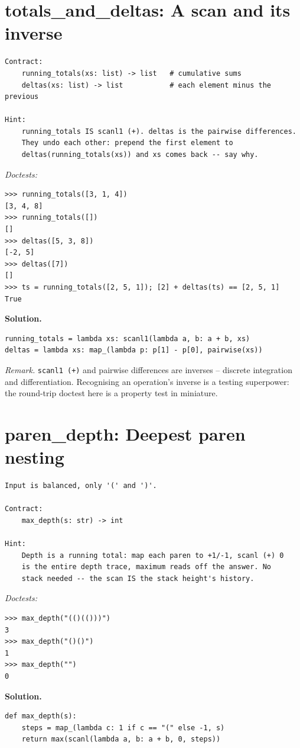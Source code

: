 \documentclass[11pt,letterpaper]{book}
\begin{document}
\section{totals\_and\_deltas: A scan and its inverse}
\begin{lstlisting}[style=spec]
Contract:
    running_totals(xs: list) -> list   # cumulative sums
    deltas(xs: list) -> list           # each element minus the previous

Hint:
    running_totals IS scanl1 (+). deltas is the pairwise differences.
    They undo each other: prepend the first element to
    deltas(running_totals(xs)) and xs comes back -- say why.
\end{lstlisting}
\noindent\textit{Doctests:}
\begin{lstlisting}[style=spec]
>>> running_totals([3, 1, 4])
[3, 4, 8]
>>> running_totals([])
[]
>>> deltas([5, 3, 8])
[-2, 5]
>>> deltas([7])
[]
>>> ts = running_totals([2, 5, 1]); [2] + deltas(ts) == [2, 5, 1]
True
\end{lstlisting}
\noindent\textbf{Solution.}
\begin{lstlisting}[style=code]
running_totals = lambda xs: scanl1(lambda a, b: a + b, xs)
deltas = lambda xs: map_(lambda p: p[1] - p[0], pairwise(xs))
\end{lstlisting}

\noindent\textit{Remark.} \texttt{scanl1 (+)} and pairwise differences are
inverses -- discrete integration and differentiation. Recognising an operation's
inverse is a testing superpower: the round-trip doctest here is a property test
in miniature.

\section{paren\_depth: Deepest paren nesting}
\begin{lstlisting}[style=spec]
Input is balanced, only '(' and ')'.

Contract:
    max_depth(s: str) -> int

Hint:
    Depth is a running total: map each paren to +1/-1, scanl (+) 0
    is the entire depth trace, maximum reads off the answer. No
    stack needed -- the scan IS the stack height's history.
\end{lstlisting}
\noindent\textit{Doctests:}
\begin{lstlisting}[style=spec]
>>> max_depth("(()(()))")
3
>>> max_depth("()()")
1
>>> max_depth("")
0
\end{lstlisting}
\noindent\textbf{Solution.}
\begin{lstlisting}[style=code]
def max_depth(s):
    steps = map_(lambda c: 1 if c == "(" else -1, s)
    return max(scanl(lambda a, b: a + b, 0, steps))
\end{lstlisting}
\end{document}
